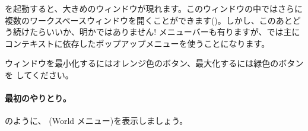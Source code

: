 \documentclass[a4paper,10pt,twoside]{book}
\begin{document}
\pharo を起動すると、大きめのウィンドウが現れます。このウィンドウの中ではさらに複数のワークスペースウィンドウを開くことができます()。しかし、このあとどう続けたらいいか、明かではありません!
メニューバーも有りますが、\pharo では主にコンテキストに依存したポップアップメニューを使うことになります。


ウィンドウを最小化するにはオレンジ色のボタン、最大化するには緑色のボタンを \click してください。

\paragraph{最初のやりとり。}

のように、 (World メニュー)を表示しましょう。


\end{document}

